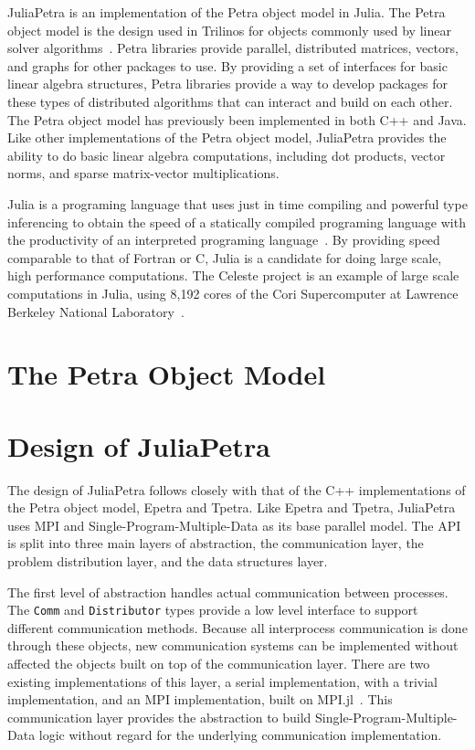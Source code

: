 \documentclass[acmsmall]{acmart}
\newcommand{\snippet}[1]{\lstinline[mathescape]{#1}}
\begin{document}
	JuliaPetra is an implementation of the Petra object model in Julia.
	The Petra object model is the design used in Trilinos for objects commonly used by linear solver algorithms~\cite{Heroux:2005:Trilinos}.
	Petra libraries provide parallel, distributed matrices, vectors, and graphs for other packages to use.
	By providing a set of interfaces for basic linear algebra structures, Petra libraries provide a way
	to develop packages for these types of distributed algorithms that can interact and build on each other.
	The Petra object model has previously been implemented in both C++ and Java.
	Like other implementations of the Petra object model, JuliaPetra provides the ability to do basic linear algebra computations, including dot products, vector norms, and sparse matrix-vector multiplications.
	
	Julia is a programing language that uses just in time compiling and powerful type inferencing
	to obtain the speed of a statically compiled programing language with the productivity of an
	interpreted programing language~\cite{Bezanson:2017:FreshApproach}.
	By providing speed comparable to that of Fortran or C, Julia is a candidate for doing large scale,
	high performance computations.
	The Celeste project is an example of large scale computations in Julia,
	using 8,192 cores of the Cori Supercomputer
	at Lawrence Berkeley National Laboratory~\cite{Bezanson:2017:FreshApproach}.
	
	\section{The Petra Object Model}
	
	
	\section{Design of JuliaPetra}
	
	The design of JuliaPetra follows closely with that of the C++ implementations of the
	Petra object model, Epetra and Tpetra.
	Like Epetra and Tpetra, JuliaPetra uses MPI and Single-Program-Multiple-Data as its base parallel model.
	The API is split into three main layers of abstraction, the communication layer, the problem distribution layer, and the data structures layer.
	
	The first level of abstraction handles actual communication between processes.
	The \snippet{Comm} and \snippet{Distributor} types provide a low level interface to support different communication methods.
	Because all interprocess communication is done through these objects, new communication systems can be implemented without affected the objects built on top of the communication layer.
	There are two existing implementations of this layer, a serial implementation, with a trivial implementation, and an MPI implementation, built on MPI.jl~\cite{Github:MPI}.
	This communication layer provides the abstraction to build Single-Program-Multiple-Data logic without regard for the underlying communication implementation.
	
\end{document}
